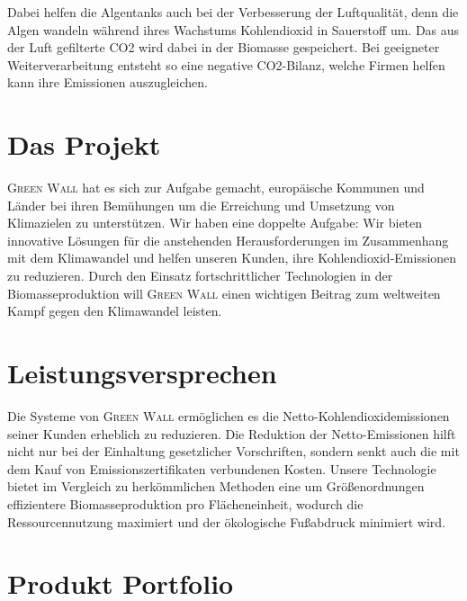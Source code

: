 Dabei helfen die Algentanks auch bei der Verbesserung der Luftqualität, denn die Algen wandeln während ihres Wachstums Kohlendioxid in Sauerstoff um.
Das aus der Luft gefilterte CO2 wird dabei in der Biomasse gespeichert.
Bei geeigneter Weiterverarbeitung entsteht so eine negative CO2-Bilanz, welche Firmen helfen kann ihre Emissionen auszugleichen.

\section{Das Projekt}
\textsc{Green Wall} hat es sich zur Aufgabe gemacht, europäische Kommunen und Länder bei ihren Bemühungen um die Erreichung und Umsetzung von Klimazielen zu unterstützen.
Wir haben eine doppelte Aufgabe: Wir bieten innovative Lösungen für die anstehenden Herausforderungen im Zusammenhang mit dem Klimawandel und helfen unseren Kunden, ihre Kohlendioxid-Emissionen zu reduzieren.
Durch den Einsatz fortschrittlicher Technologien in der Biomasseproduktion will \textsc{Green Wall} einen wichtigen Beitrag zum weltweiten Kampf gegen den Klimawandel leisten.

\section{Leistungsversprechen}
Die Systeme von \textsc{Green Wall} ermöglichen es die Netto-Kohlendioxidemissionen seiner Kunden erheblich zu reduzieren.
Die Reduktion der Netto-Emissionen hilft nicht nur bei der Einhaltung gesetzlicher Vorschriften, sondern senkt auch die mit dem Kauf von Emissionszertifikaten verbundenen Kosten.
Unsere Technologie bietet im Vergleich zu herkömmlichen Methoden eine um Größenordnungen effizientere Biomasseproduktion pro Flächeneinheit, wodurch die Ressourcennutzung maximiert und der ökologische Fußabdruck minimiert wird.

\section{Produkt Portfolio}


